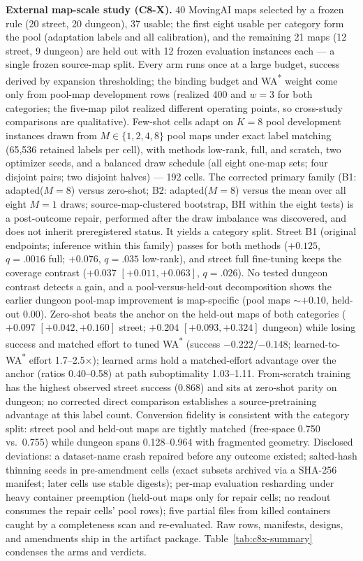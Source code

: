 \documentclass[letterpaper]{article} %
\begin{document}
\textbf{External map-scale study (C8-X).} 40 MovingAI maps selected by a
frozen rule (20 street, 20 dungeon), 37 usable; the first eight usable
per category form the pool (adaptation labels and all calibration), and
the remaining 21 maps (12 street, 9 dungeon) are held out with 12 frozen
evaluation instances each --- a single frozen source-map split. Every arm runs once at a large budget, success derived by expansion thresholding; the binding budget and WA\textsuperscript{*} weight come
only from pool-map development rows (realized 400 and $w{=}3$ for both categories; the five-map pilot realized different operating points, so cross-study comparisons are qualitative). Few-shot
cells adapt on $K{=}8$ pool development instances drawn from $M \in \{1,
2, 4, 8\}$ pool maps under exact label matching (65{,}536 retained labels per cell), with methods low-rank, full, and scratch, two optimizer seeds, and a balanced draw schedule (all eight one-map sets; four disjoint pairs; two
disjoint halves) --- 192 cells. The corrected primary family (B1:
adapted($M{=}8$) versus zero-shot; B2: adapted($M{=}8$) versus the mean
over all eight $M{=}1$ draws; source-map-clustered bootstrap, BH within the eight tests) is a post-outcome repair, performed after the draw imbalance was discovered, and does not inherit preregistered status. It yields a category split. Street B1 (original endpoints; inference within this family) passes for both
methods ($+0.125$, $q{=}.0016$ full; $+0.076$, $q{=}.035$ low-rank), and street full fine-tuning keeps the coverage contrast ($+0.037$ $[+0.011,+0.063]$, $q{=}.026$). No tested dungeon contrast detects a gain, and a pool-versus-held-out decomposition shows the earlier dungeon pool-map improvement is map-specific (pool maps ${\sim}+0.10$, held-out $0.00$). Zero-shot beats the anchor on the held-out maps of both
categories ($+0.097$ $[+0.042,+0.160]$ street; $+0.204$ $[+0.093,+0.324]$
dungeon) while losing success and matched effort to tuned
WA\textsuperscript{*} (success $-0.222$/$-0.148$; learned-to-WA\textsuperscript{*}
effort 1.7--2.5$\times$); learned arms hold a matched-effort advantage
over the anchor (ratios 0.40--0.58) at path suboptimality 1.03--1.11.
From-scratch training has the highest observed street success (0.868)
and sits at zero-shot parity on dungeon; no corrected direct comparison
establishes a source-pretraining advantage at this label count. Conversion fidelity is consistent with the category split: street pool and held-out maps are tightly matched (free-space 0.750 vs.\ 0.755) while dungeon spans 0.128--0.964 with fragmented
geometry. Disclosed deviations: a dataset-name crash repaired before any
outcome existed; salted-hash thinning seeds in pre-amendment cells
(exact subsets archived via a SHA-256 manifest; later cells use stable
digests); per-map evaluation resharding under heavy container preemption
(held-out maps only for repair cells; no readout consumes the repair cells' pool rows); five partial files from killed containers caught by a completeness scan and re-evaluated. Raw rows, manifests, designs, and
amendments ship in the artifact package. Table~\ref{tab:c8x-summary} condenses the arms and verdicts.


\end{document}
